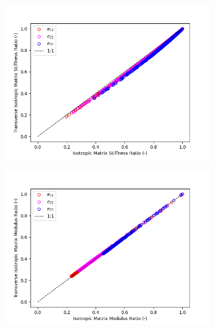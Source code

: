 \documentclass[a4paper,fleqn]{DC_ArtStyle}
\begin{document}
	\begin{figure}
		\begin{subfigure}[b]{0.45\linewidth}
			\includegraphics[width=\linewidth]{LambdaiiStiffness_Ratios}
		\end{subfigure}
		\begin{subfigure}[b]{0.45\linewidth}
			\includegraphics[width=\linewidth]{LambdaiiModulus_Ratios}
		\end{subfigure}
		\begin{subfigure}[b]{0.45\linewidth}

\end{subfigure}
\end{figure}
\end{document}
